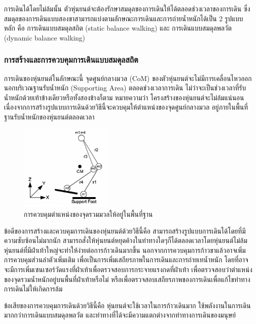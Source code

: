 การเดินได้โดยไม่ล้มนั้น ตัวหุ่นยนต์จะต้องรักษาสมดุลของการเดินให้ได้ตลอดช่วงเวลาของการเดิน
ซึ่งสมดุลของการเดินแบบสองขาสามารถแบ่งตามลักษณะการเดินและการถ่ายน้ำหนักได้เป็น 2 รูปแบบหลัก คือ 
การเดินแบบสมดุลสถิต (static balance walking) และ การเดินแบบสมดุลพลวัต (dynamic balance walking)

\subsubsection{การสร้างและการควบคุมการเดินแบบสมดุลสถิต}
การเดินของหุ่นยนต์ในลักษณะนี้ จุดศูนย์กลางมวล (CoM) ของตัวหุ่นยนต์จะไม่มีการเคลื่อนไหวออกนอกบริเวณฐานรับน้ำหนัก (Supporting Area)
ตลอดช่วงเวลาการเดิน ไม่ว่าจะเป็นช่วงเวลาที่รับน้ำหนักด้วยเท้าข้างเดียวหรือทั้งสองข้างก็ตาม หมายความว่า โครงสร้างของหุ่นยนต์จะไม่ล้มแน่นอน
เนื่องจากการสร้างรูปแบบการเดินด้วยวิธีนี้จะควบคุมให้ตำแหน่งของจุดศูนย์กลางมวล อยู่ภายในพื้นที่ฐานรับน้ำหนักของหุ่นยนต์ตลอดเวลา

\begin{figure}[ht]
	\centering
	\includegraphics[width=0.4\textwidth]{chapter2/images/cominsupportpolygon.png}
	\caption{การควบคุมตำแหน่งของจุดรวมมวลให้อยู่ในพื้นที่ฐาน}
	\label{fig:robot_com_support}
\end{figure}

ข้อดีของการสร้างและควบคุมการเดินของหุ่นยนต์ด้วยวิธีนี้คือ สามารถสร้างรูปแบบการเดินได้โดยที่มีความซับซ้อนไม่มากนัก
สามารถสั่งให้หุ่นยนต์หยุดค้างในท่าทางใดๆก็ได้ตลอดเวลาโดยหุ่นยนต์ไม่ล้ม หุ่นยนต์ที่มีฝ่าเท้าใหญ่จะทำให้ง่ายต่อการก้าวเดินมากขึ้น
นอกจากการควบคุมการก้าวขาแล้วอาจเพิ่มการควบคุมส่วนลำตัวเพิ่มเติม เพื่อเป็นการเพิ่มเสถียรภาพในการเดินและการถ่ายเทน้ำหนัก
โดยที่อาจจะมีการเพิ่มเซนเซอร์วัดแรงที่ฝ่าเท้าเพื่อตรวจสอบการกระจายแรงกดที่ฝ่าเท้า เพื่อตรวจสอบว่าตำแหน่งของจุดรวมน้ำหนักอยู่บนพื้นที่ฝ่าเท้าหรือไม่
หรือเพื่อตรวจสอบเสถียรภาพของการเดินเพื่อแก้ไขท่าทางการเดินไม่ให้เกิดการล้ม

ข้อเสียของการควบคุมการเดินด้วยวิธีนี้คือ หุ่นยนต์จะใช้เวลาในการก้าวเดินมาก ใช้พลังงานในการเดินมากกว่าการเดินแบบสมดุลพลวัต
และท่าทางที่ได้จะมีความแตกต่างจากท่าทางการเดินของมนุษย์

